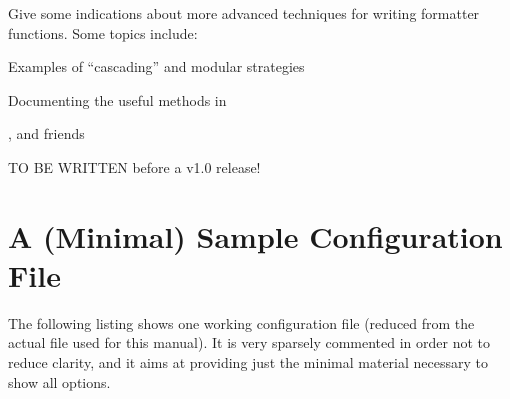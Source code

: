 \documentclass{scrartcl}
\begin{document}
Give some indications about more advanced techniques for writing formatter functions. Some topics include:

\begin{itemize*}
\item Examples of “cascading” and modular strategies
\item Documenting the useful methods in 
\item {},  and friends
\end{itemize*}

TO BE WRITTEN before a v1.0 release!

\pagebreak
\section{A (Minimal) Sample Configuration File}
\label{sec:sample-config}

The following listing shows one working configuration file (reduced from the
actual file used for this manual). It is very sparsely commented in order not to
reduce clarity, and it aims at providing just the minimal material necessary to
show all options.

\inputminted{lua}{luatemplates-manual-config-mwe.lua}
\end{document}
